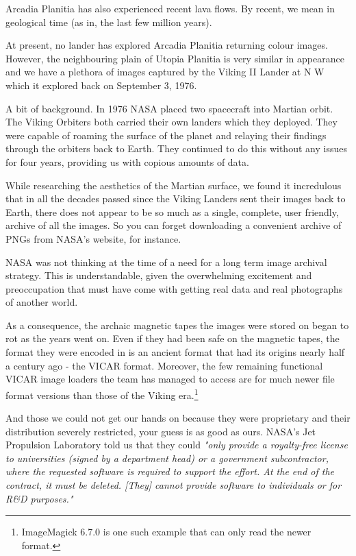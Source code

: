 Arcadia Planitia has also experienced recent lava flows. By recent, we mean in geological time (as in, the last few million years).


At present, no lander has explored Arcadia Planitia returning colour images. However, the neighbouring plain of Utopia Planitia is very similar in appearance and we have a plethora of images captured by the Viking II Lander at N W which it explored back on September 3, 1976.

A bit of background. In 1976 NASA placed two spacecraft into Martian orbit. The Viking Orbiters both carried their own landers which they deployed. They were capable of roaming the surface of the planet and relaying their findings through the orbiters back to Earth. They continued to do this without any issues for four years, providing us with copious amounts of data. 


While researching the aesthetics of the Martian surface, we found it incredulous that in all the decades passed since the Viking Landers sent their images back to Earth, there does not appear to be so much as a single, complete, user friendly, archive of all the images. So you can forget downloading a convenient archive of PNGs from NASA's website, for instance.

NASA was not thinking at the time of a need for a long term image archival strategy. This is understandable, given the overwhelming excitement and preoccupation that must have come with getting real data and real photographs of another world.

As a consequence, the archaic magnetic tapes the images were stored on began to rot as the years went on. Even if they had been safe on the magnetic tapes, the format they were encoded in is an ancient format that had its origins nearly half a century ago - the VICAR format. Moreover, the few remaining functional VICAR image loaders the team has managed to access are for much newer file format versions than those of the Viking era.\footnote{ImageMagick 6.7.0 is one such example that can only read the newer format.}

And those we could not get our hands on because they were proprietary and their distribution severely restricted, your guess is as good as ours. NASA's Jet Propulsion Laboratory told us that they could {\it "only provide a royalty-free license to universities (signed by a department head) or a government subcontractor, where the requested software is required to support the effort. At the end of the contract, it must be deleted. [They] cannot provide software to individuals or for R&D purposes."}

